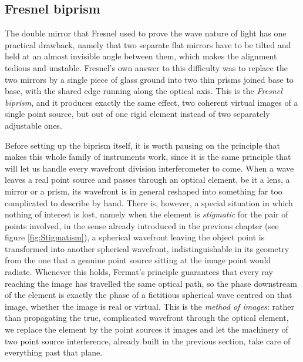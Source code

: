     \subsection{Fresnel biprism}

        The double mirror that Fresnel used to prove the wave nature of light \cite{fresnel1819memoire} has one practical drawback, namely that two separate flat mirrors have to be tilted and held at an almost invisible angle between them, which makes the alignment tedious and unstable. Fresnel's own answer to this difficulty was to replace the two mirrors by a single piece of glass ground into two thin prisms joined base to base, with the shared edge running along the optical axis. This is the \textit{Fresnel biprism}, and it produces exactly the same effect, two coherent virtual images of a single point source, but out of one rigid element instead of two separately adjustable ones.

        Before setting up the biprism itself, it is worth pausing on the principle that makes this whole family of instruments work, since it is the same principle that will let us handle every wavefront division interferometer to come. When a wave leaves a real point source and passes through an optical element, be it a lens, a mirror or a prism, its wavefront is in general reshaped into something far too complicated to describe by hand. There is, however, a special situation in which nothing of interest is lost, namely when the element is \textit{stigmatic} for the pair of points involved, in the sense already introduced in the previous chapter (see figure \ref{fig:Stigmatism}), a spherical wavefront leaving the object point is transformed into another spherical wavefront, indistinguishable in its geometry from the one that a genuine point source sitting at the image point would radiate. Whenever this holds, Fermat's principle guarantees that every ray reaching the image has travelled the same optical path, so the phase downstream of the element is exactly the phase of a fictitious spherical wave centred on that image, whether the image is real or virtual. This is the \textit{method of images}: rather than propagating the true, complicated wavefront through the optical element, we replace the element by the point sources it images and let the machinery of two point source interference, already built in the previous section, take care of everything past that plane.

